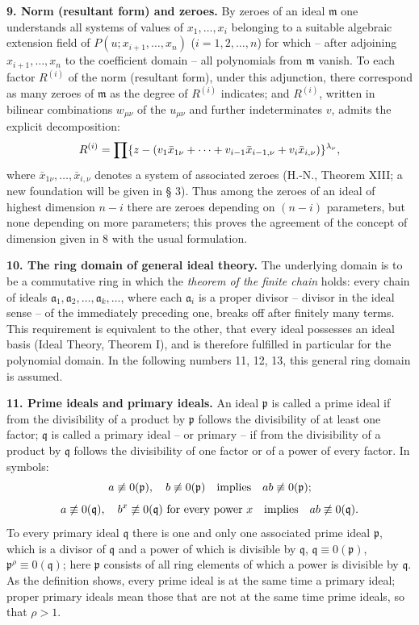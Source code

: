 \documentclass[11pt]{article}
\providecommand{\frakm}{\mathfrak m}
\providecommand{\frakp}{\mathfrak p}
\providecommand{\frakq}{\mathfrak q}
\providecommand{\fraka}{\mathfrak a}
\providecommand{\fraka}{\mathfrak a}
\providecommand{\frakp}{\mathfrak p}
\providecommand{\frakp}{\mathfrak p}
\providecommand{\frakq}{\mathfrak q}
\begin{document}
\textbf{9. Norm (resultant form) and zeroes.} By zeroes of an ideal $\frakm$ one understands all systems of values of $x_1,\ldots,x_i$ belonging to a suitable algebraic extension field of $P(u;x_{i+1},\ldots,x_n)$ ($i=1,2,\ldots,n$) for which -- after adjoining $x_{i+1},\ldots,x_n$ to the coefficient domain -- all polynomials from $\frakm$ vanish. To each factor $R^{(i)}$ of the norm (resultant form), under this adjunction, there correspond as many zeroes of $\frakm$ as the degree of $R^{(i)}$ indicates; and $R^{(i)}$, written in bilinear combinations $w_{\mu\nu}$ of the $u_{\mu\nu}$ and further indeterminates $v$, admits the explicit decomposition:
\begin{equation}
 R^{(i)}=\prod\{z-(v_1\bar{x}_{1\nu}+\cdots+v_{i-1}\bar{x}_{i-1,\nu}+v_i\bar{x}_{i,\nu})\}^{\lambda_\nu}, \notag
\end{equation}
where $\bar{x}_{1\nu},\ldots,\bar{x}_{i,\nu}$ denotes a system of associated zeroes (H.-N., Theorem XIII; a new foundation will be given in § 3). Thus among the zeroes of an ideal of highest dimension $n-i$ there are zeroes depending on $(n-i)$ parameters, but none depending on more parameters; this proves the agreement of the concept of dimension given in 8 with the usual formulation.

\textbf{10. The ring domain of general ideal theory.} The underlying domain is to be a commutative ring in which the \emph{theorem of the finite chain} holds: every chain of ideals $\fraka_1,\fraka_2,\ldots,\fraka_k,\ldots$, where each $\fraka_i$ is a proper divisor -- divisor in the ideal sense -- of the immediately preceding one, breaks off after finitely many terms. This requirement is equivalent to the other, that every ideal possesses an ideal basis (Ideal Theory, Theorem I), and is therefore fulfilled in particular for the polynomial domain. In the following numbers 11, 12, 13, this general ring domain is assumed.

\textbf{11. Prime ideals and primary ideals.} An ideal $\frakp$ is called a prime ideal if from the divisibility of a product by $\frakp$ follows the divisibility of at least one factor; $\frakq$ is called a primary ideal -- or primary -- if from the divisibility of a product by $\frakq$ follows the divisibility of one factor or of a power of every factor. In symbols:
\[
 a\not\equiv0(\frakp),\quad b\not\equiv0(\frakp)\quad\hbox{implies}\quad ab\not\equiv0(\frakp);
\]
\[
 a\not\equiv0(\frakq),\quad b^x\not\equiv0(\frakq)\ \hbox{for every power }x\quad\hbox{implies}\quad ab\not\equiv0(\frakq).
\]
To every primary ideal $\frakq$ there is one and only one associated prime ideal $\frakp$, which is a divisor of $\frakq$ and a power of which is divisible by $\frakq$, $\frakq\equiv0(\frakp)$, $\frakp^\rho\equiv0(\frakq)$; here $\frakp$ consists of all ring elements of which a power is divisible by $\frakq$. As the definition shows, every prime ideal is at the same time a primary ideal; proper primary ideals mean those that are not at the same time prime ideals, so that $\rho>1$.
\end{document}
